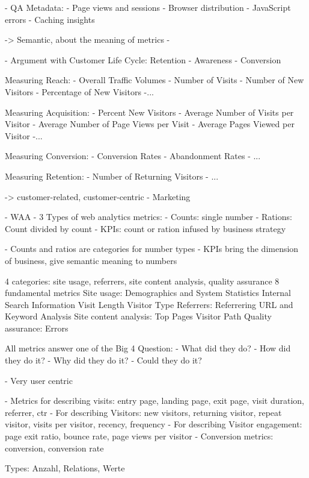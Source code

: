 - QA Metadata:
	- Page views and sessions
	- Browser distribution
	- JavaScript errors
	- Caching insights
	
-> Semantic, about the meaning of metrics
- 
	
	
- Argument with Customer Life Cycle: Retention - Awareness - Conversion

 Measuring Reach:
 - Overall Traffic Volumes
 - Number of Visits
- Number of New Visitors
- Percentage of New Visitors
-...

 Measuring Acquisition:
- Percent New Visitors
- Average Number of Visits per Visitor
- Average Number of Page Views per Visit
- Average Pages Viewed per Visitor
-...
 
 Measuring Conversion:
 - Conversion Rates
- Abandonment Rates
- ... 
 
 
 Measuring Retention:
 - Number of Returning Visitors
 - ...
 
-> customer-related, customer-centric
- Marketing


- WAA
- 3 Types of web analytics metrics:
- Counts: single number
- Rations: Count divided by count
- KPIs: count or ration infused by business strategy

- Counts and ratios are categories for number types
- KPIs bring the dimension of business, give semantic meaning to numbers


 4 categories: site usage, referrers, site content analysis, quality assurance
 8 fundamental metrics
 Site usage:
	 Demographics and System Statistics
	 Internal Search Information
	 Visit Length
	 Visitor Type	
 Referrers:
	 Referrering URL and Keyword Analysis	
 Site content analysis:
	 Top Pages
	 Visitor Path
 Quality assurance:
	 Errors
	 
	 
All metrics answer one of the Big 4 Question:
- What did they do?
- How did they do it?
- Why did they do it?
- Could they do it?

- Very user centric



- Metrics for describing visits: entry page, landing page, exit page, visit duration, referrer, ctr
- For describing Visitors: new visitors, returning visitor, repeat visitor, visits per visitor, recency, frequency
- For describing Visitor engagement: page exit ratio, bounce rate, page views per visitor
- Conversion metrics: conversion, conversion rate



 Types: Anzahl, Relations, Werte
 
